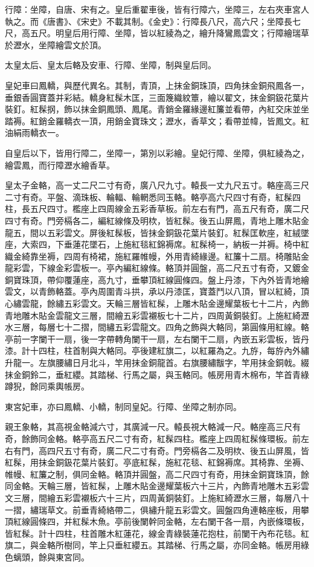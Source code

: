 行障：坐障，自唐、宋有之。皇后重翟車後，皆有行障六，坐障三，左右夾車宮人執之。而《唐書》、《宋史》不載其制。《金史》：行障長八尺，高六尺；坐障長七尺，高五尺。明皇后用行障、坐障，皆以紅綾為之，繪升降鸞鳳雲文；行障繪瑞草於瀝水，坐障繪雲文於頂。

太皇太后、皇太后輅及安車、行障、坐障，制與皇后同。

皇妃車曰鳳轎，與歷代異名。其制，青頂，上抹金銅珠頂，四角抹金銅飛鳳各一，垂銀香圓寶蓋并彩結。轎身紅髹木匡，三面篾織紋簟，繪以翟文，抹金銅鈒花葉片裝釘。紅髹㧏，飾以抹金銅鳳頭、鳳尾。青銷金羅緣邊紅簾並看帶，內紅交床並坐踏褥。紅銷金羅轎衣一頂，用銷金寶珠文；瀝水，香草文；看帶並幃，皆鳳文。紅油絹雨轎衣一。

自皇后以下，皆用行障二，坐障一，第別以彩繪。皇妃行障、坐障，俱紅綾為之，繪雲鳳，而行障瀝水繪香草。

皇太子金輅，高一丈二尺二寸有奇，廣八尺九寸。轅長一丈九尺五寸。輅座高三尺二寸有奇。平盤、滴珠板、輪輻、輪輞悉同玉輅。輅亭高六尺四寸有奇，紅髹四柱，長五尺四寸。檻座上四周線金五彩香草板。前左右有門，高五尺有奇，廣二尺四寸有奇。門旁槅各二，編紅線條及明栨，皆紅髹。後五山屏鳳，青地上雕木貼金龍五，間以五彩雲文。屏後紅髹板，皆抹金銅鈒花葉片裝釘。紅髹匡軟座，紅絨墜座，大索四，下垂蓮花墜石，上施紅毯紅錦褥席。紅髹椅一，納板一并褥。椅中紅織金綺靠坐褥，四周有椅裙，施紅羅帷幔，外用青綺緣邊。紅簾十二扇。椅雕貼金龍彩雲，下線金彩雲板一。亭內編紅線條。輅頂并圓盤，高二尺五寸有奇，又鍍金銅寶珠頂，帶仰覆蓮座，高九寸，垂攀頂紅線圓條四。盤上丹漆，下內外皆青地繪雲文，以青飾輅蓋。亭內周圍青斗拱，承以丹漆匡，寶蓋鬥以八頂，冒以紅綺，頂心繡雲龍，餘繡五彩雲文。天輪三層皆紅髹，上雕木貼金邊耀葉板七十二片，內飾青地雕木貼金雲龍文三層，間繪五彩雲襯板七十二片，四周黃銅裝釘。上施紅綺瀝水三層，每層七十二摺，間繡五彩雲龍文。四角之飾與大輅同，第圓條用紅線。輅亭前一字闌干一扇，後一字帶轉角闌干一扇，左右闌干二扇，內嵌五彩雲板，皆丹漆。計十四柱，柱首制與大輅同。亭後建紅旗二，以紅羅為之。九斿，每斿內外繡升龍一。左旗腰繡日月北斗，竿用抹金銅龍首。右旗腰繡黻字，竿用抹金銅戟。綴抹金銅鈴二，垂紅纓。其踏梯、行馬之屬，與玉輅同。帳房用青木棉布，竿首青綠蹲猊，餘同乘輿帳房。

東宮妃車，亦曰鳳轎、小轎，制同皇妃。行障、坐障之制亦同。

親王象輅，其高視金輅減六寸，其廣減一尺。轅長視大輅減一尺。輅座高三尺有奇，餘飾同金輅。輅亭高五尺二寸有奇，紅髹四柱。檻座上四周紅髹條環板。前左右有門，高四尺五寸有奇，廣二尺二寸有奇。門旁槅各二及明栨、後五山屏風，皆紅髹，用抹金銅鈒花葉片裝釘。亭底紅髹，施紅花毯、紅錦褥席。其椅靠、坐褥、帷幔、紅簾之制，俱同金輅。輅頂并圓盤，高二尺四寸有奇，用抹金銅寶珠頂，餘同金輅。天輪三層，皆紅髹，上雕木貼金邊耀葉板六十三片，內飾青地雕木五彩雲文三層，間繪五彩雲襯板六十三片，四周黃銅裝釘。上施紅綺瀝水三層，每層八十一摺，繡瑞草文。前垂青綺絡帶二，俱繡升龍五彩雲文。圓盤四角連輅座板，用攀頂紅線圓條四，并紅髹木魚。亭前後闌幹同金輅，左右闌干各一扇，內嵌條環板，皆紅髹。計十四柱，柱首雕木紅蓮花，線金青綠裝蓮花抱柱，前闌干內布花毯。紅旗二，與金輅所樹同，竿上只垂紅纓五。其踏梯、行馬之屬，亦同金輅。帳房用綠色螭頭，餘與東宮同。

